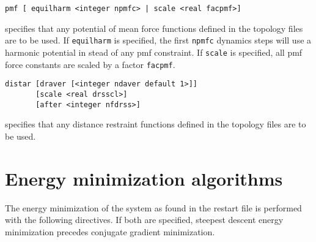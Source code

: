 \begin{description}
\item
\begin{verbatim}
pmf [ equilharm <integer npmfc> | scale <real facpmf>]
\end{verbatim}
specifies that any potential of mean force functions defined in the
topology files are to be used. If \verb+equilharm+ is specified, the
first \verb+npmfc+ dynamics steps will use a harmonic potential
in stead of any pmf constraint. If \verb+scale+ is specified, all
pmf force constants are scaled by a factor \verb+facpmf+.

\item
\begin{verbatim}
distar [draver [<integer ndaver default 1>]] 
       [scale <real drsscl>]
       [after <integer nfdrss>]
\end{verbatim}
specifies that any distance restraint functions defined in the
topology files are to be used. 



\end{description}

\section{Energy minimization algorithms}
The energy minimization of the system as found in the restart file 
is performed with the following directives. If both are specified,
steepest descent energy minimization precedes conjugate gradient 
minimization.

